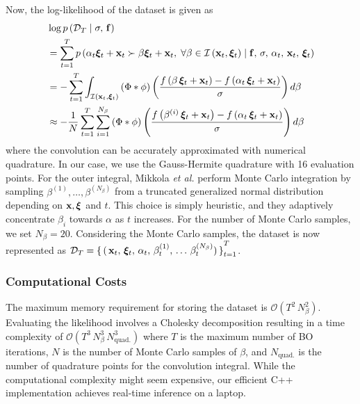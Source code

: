 Now, the log-likelihood of the dataset is given as
{\small
\begin{align*}
  &\log p\left(\mathcal{D}_T \mid \sigma,\, \mathbf{f} \right)  \\
  &= \sum_{t=1}^{T} p\left(\alpha_t \bm{\xi}_t + \mathbf{x}_t \succ \beta \bm{\xi}_t + \mathbf{x}_t,\; \forall \beta \in \mathcal{I}\left(\mathbf{x}_t, \bm{\xi}_t\right) \mid \mathbf{f},\, \sigma,\, \alpha_t,\, \mathbf{x}_t,\, \bm{\xi}_t\right) \\
  &= -\sum_{t=1}^{T} \int_{\mathcal{I}\left(\mathbf{x}_{t}, \bm{\xi}_{t}\right)} \left(\Phi * \phi \right) \left( \frac{ f\left(\beta \, \bm{\xi}_{t} + \mathbf{x}_{t} \right) - f\left(\alpha_{t} \, \bm{\xi}_{t} + \mathbf{x}_{t} \right) }{\sigma} \right) d\beta \\
  &\approx -\frac{1}{N}  \sum_{t=1}^{T} \sum_{i=1}^{N_{\beta}} \left(\Phi * \phi \right) \left( \frac{ f\left(\beta^{(i)} \, \bm{\xi}_{t} + \mathbf{x}_{t} \right) - f\left(\alpha_{t} \, \bm{\xi}_{t} + \mathbf{x}_{t} \right) }{\sigma} \right) d\beta
\end{align*}
}%
{\noindent}where the convolution can be accurately approximated with numerical quadrature.
In our case, we use the Gauss-Hermite quadrature with 16 evaluation points.
For the outer integral, Mikkola \textit{et al.} perform Monte Carlo integration by sampling \(\beta^{(1)}, \ldots, \beta^{(N_{\beta})} \) from a truncated generalized normal distribution depending on \(\mathbf{x}, \bm{\xi}\) and \(t\).
This choice is simply heuristic, and they adaptively concentrate \(\beta_i\) towards \(\alpha\) as \(t\) increases.
For the number of Monte Carlo samples, we set \(N_{\beta}=20\).
Considering the Monte Carlo samples, the dataset is now represented as \(\mathcal{D}_{T} = {\{\,(\,\mathbf{x}_{t},\, \bm{\xi}_{t},\, \alpha_{t},\, \beta^{(1)}_{t},\, \ldots\, \beta^{(N_{\beta})}_{t})\,\}}_{t=1}^{T}\).

\subsubsection{Computational Costs}
The maximum memory requirement for storing the dataset is \(\mathcal{O}\left( T^2 \, N_{\beta}^2  \right)\).
Evaluating the likelihood involves a Cholesky decomposition resulting in a time complexity of \(\mathcal{O}\left( T^3 \, N_{\beta}^3 \, N_{\text{quad.}}^3  \right)\) where \(T\) is the maximum number of BO iterations, \(N\) is the number of Monte Carlo samples of \(\beta\), and \(N_{\text{quad.}}\) is the number of quadrature points for the convolution integral.
While the computational complexity might seem expensive, our efficient C++ implementation achieves real-time inference on a laptop.

